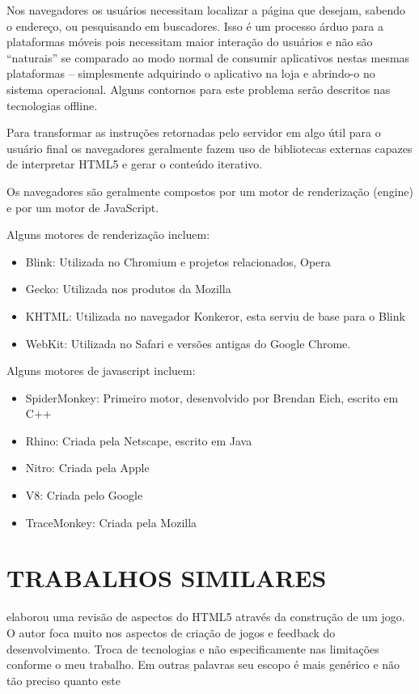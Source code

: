 \documentclass[
12pt,
a4paper,
portuges,
draft
]{report}
\begin{document}
Nos navegadores os usuários necessitam localizar a página que desejam,
sabendo o endereço, ou pesquisando em buscadores. Isso é um processo
árduo para a plataformas móveis pois necessitam maior interação
do usuários e não são “naturais” se comparado ao modo normal
de consumir aplicativos nestas mesmas plataformas – simplesmente
adquirindo o aplicativo na loja e abrindo-o no sistema operacional.
Alguns contornos para este problema serão descritos nas tecnologias
offline.

Para transformar as instruções retornadas pelo servidor em algo útil
para o usuário final os navegadores geralmente fazem uso de bibliotecas
externas capazes de interpretar HTML5 e gerar o conteúdo iterativo.

Os navegadores são geralmente compostos por um motor de renderização (engine)
e por um motor de JavaScript.

Alguns motores de renderização incluem:

\begin{itemize}
    \item Blink: Utilizada no Chromium e projetos relacionados, Opera
    \item Gecko: Utilizada nos produtos da Mozilla
    \item KHTML: Utilizada no navegador Konkeror, esta serviu de base para o Blink
    \item WebKit: Utilizada no Safari e versões antigas do Google Chrome.
\end{itemize}

Alguns motores de javascript incluem:

\begin{itemize}
    \item SpiderMonkey: Primeiro motor, desenvolvido por Brendan Eich, escrito em C++
    \item Rhino: Criada pela Netscape, escrito em Java
    \item Nitro: Criada pela Apple
    \item V8: Criada pelo Google
    \item TraceMonkey: Criada pela Mozilla
\end{itemize}


\section{TRABALHOS SIMILARES}

\cite{crossPlatformMobileGame} elaborou uma revisão de aspectos do
HTML5 através da construção de um jogo. O autor foca muito nos
aspectos de criação de jogos e feedback do desenvolvimento. Troca
de tecnologias e não especificamente nas limitações conforme o meu
trabalho. Em outras palavras seu escopo é mais genérico e não tão
preciso quanto este
\end{document}
